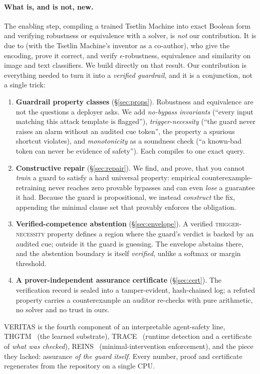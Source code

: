 \documentclass[11pt]{article}
\begin{document}
\paragraph{What is, and is not, new.} The enabling step, compiling a trained
Tsetlin Machine into exact Boolean form and verifying robustness or equivalence
with a solver, is \emph{not} our contribution. It is due to
\citet{przybysz2023verifying} (with the Tsetlin Machine's inventor as a co-author),
who give the encoding, prove it correct, and verify $\epsilon$-robustness,
equivalence and similarity on image and text classifiers. We build directly on
that result. Our contribution is everything needed to turn it into a
\emph{verified guardrail}, and it is a conjunction, not a single trick:
\begin{enumerate}[leftmargin=1.5em,itemsep=2pt]
\item \textbf{Guardrail property classes} (\S\ref{sec:props}). Robustness and
equivalence are not the questions a deployer asks. We add \emph{no-bypass
invariants} (``every input matching this attack template is flagged''),
\emph{trigger-necessity} (``the guard never raises an alarm without an audited cue
token'', the property a spurious shortcut violates), and \emph{monotonicity} as a
soundness check (``a known-bad token can never be evidence of safety''). Each
compiles to one exact query.
\item \textbf{Constructive repair} (\S\ref{sec:repair}). We find, and prove, that
you cannot \emph{train} a guard to satisfy a hard universal property: empirical
counterexample-retraining never reaches zero provable bypasses and can even
\emph{lose} a guarantee it had. Because the guard is propositional, we instead
\emph{construct} the fix, appending the minimal clause set that provably enforces
the obligation.
\item \textbf{Verified-competence abstention} (\S\ref{sec:envelope}). A verified
\textsc{trigger-necessity} property defines a region where the guard's verdict is
backed by an audited cue; outside it the guard is guessing. The envelope abstains
there, and the abstention boundary is itself \emph{verified}, unlike a softmax or
margin threshold.
\item \textbf{A prover-independent assurance certificate} (\S\ref{sec:cert}). The
verification record is sealed into a tamper-evident, hash-chained log; a refuted
property carries a counterexample an auditor re-checks with pure arithmetic, no
solver and no trust in ours.
\end{enumerate}
VERITAS is the fourth component of an interpretable agent-safety line, THGTM~\citep{debes2026thgtm} (the learned substrate), TRACE~\citep{debes2026trace}
(runtime detection and a certificate of \emph{what was checked}),
REINS~\citep{debes2026reins} (minimal-intervention enforcement), and the piece
they lacked: assurance \emph{of the guard itself}. Every number, proof and
certificate regenerates from the repository on a single CPU.
\end{document}
